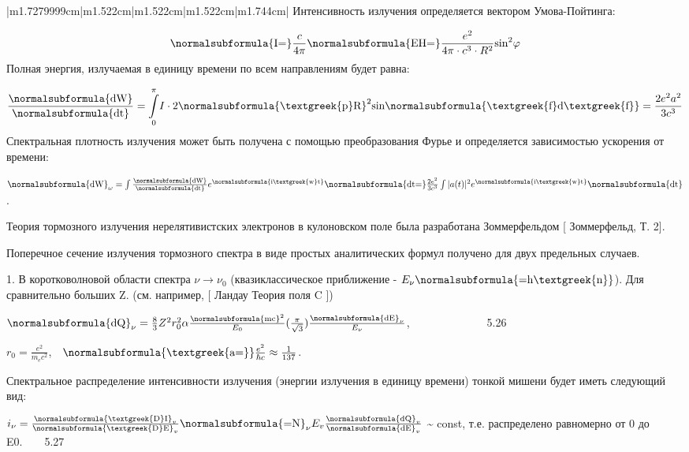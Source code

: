 \documentclass[a4paper,14pt, openany, twoside, draft]{extbook} %
\begin{document}
\begin{flushleft}
\begin{supertabular}{|m{1.7279999cm}|m{1.522cm}|m{1.522cm}|m{1.522cm}|m{1.744cm}|}
Интенсивность излучения определяется вектором Умова-Пойтинга:

\begin{equation*}
\normalsubformula{\text{I=}}\frac c{4\pi }\normalsubformula{\text{EH=}}\frac{e^2}{4\pi \cdot c^3\cdot R^2}\text{sin}^2\varphi
\end{equation*}
Полная энергия, излучаемая в единицу времени по всем направлениям будет равна:

\begin{equation*}
\frac{\normalsubformula{\text{dW}}}{\normalsubformula{\text{dt}}}=\overset{\pi }{\underset 0{\int }}I\cdot 2\normalsubformula{\text{\textgreek{p}R}}^2\text{sin}\normalsubformula{\text{\textgreek{f}d\textgreek{f}}}=\frac{2e^2a^2}{3c^3}
\end{equation*}
Спектральная плотность излучения может быть получена с помощью преобразования Фурье и определяется зависимостью ускорения от времени:

 $\normalsubformula{\text{dW}}_{\omega }=\int \frac{\normalsubformula{\text{dW}}}{\normalsubformula{\text{dt}}}e^{\normalsubformula{\text{i\textgreek{w}t}}}\normalsubformula{\text{dt=}}\frac{2e^2}{3c^3}\int |a(t)|^2e^{\normalsubformula{\text{i\textgreek{w}t}}}\normalsubformula{\text{dt}}$.

Теория тормозного излучения нерелятивистских электронов в кулоновском поле была разработана Зоммерфельдом [ Зоммерфельд, Т. 2].

Поперечное сечение излучения тормозного спектра в виде простых аналитических формул получено для двух предельных случаев.

1. В коротковолновой области спектра  $\nu \rightarrow \nu _0$ (квазиклассическое приближение -  $E_{\nu }\normalsubformula{\text{=h\textgreek{n}}}$). Для сравнительно больших Z. (см. например, [ Ландау Теория поля C ])

 $\normalsubformula{\text{dQ}}_{\nu }=\frac 8 3Z^2r_0^2\alpha \frac{\normalsubformula{\text{mc}}^2}{E_0}(\frac{\pi }{\sqrt 3})\frac{\normalsubformula{\text{dE}}_{\nu }}{E_{\nu }}$,\ \ \ \ \ \ \ \ \ \ \ \ \ \ 5.26

 $r_0=\frac{e^2}{m_ec^2}$,\ \  $\normalsubformula{\text{\textgreek{a=}}}\frac{e^2}{\hbar c}\approx \frac 1{137}$.

Спектральное распределение интенсивности излучения (энергии излучения в единицу времени) тонкой мишени будет иметь следующий вид:

 $i_{\nu }=\frac{\normalsubformula{\text{\textgreek{D}I}}_v}{\normalsubformula{\text{\textgreek{D}E}}_v}\normalsubformula{\text{=N}}_{\nu }E_v\frac{\normalsubformula{\text{dQ}}_v}{\normalsubformula{\text{dE}}_v}$  \~{} const, т.е. распределено равномерно от 0 до E0.\ \ \ \ 5.27


\end{supertabular}
\end{flushleft}
\end{document}
